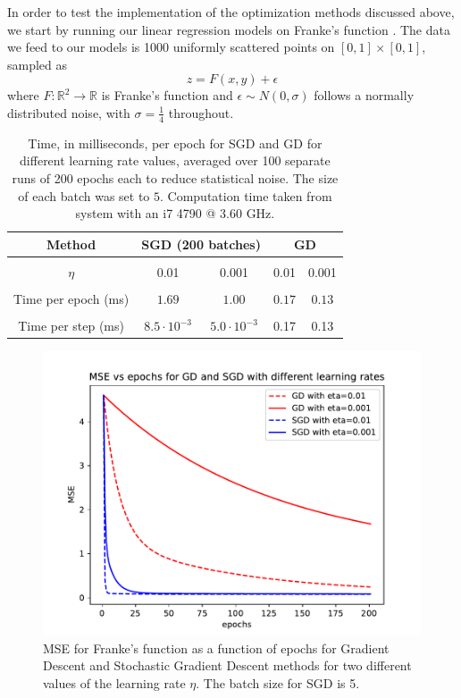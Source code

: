 \documentclass[aps,reprint,superscriptaddress,nofootinbib]{revtex4-2}
\begin{document}
In order to test the implementation of the optimization methods discussed above, we start by running our linear regression models on Franke's function \cite{franke1979critical}. The data we feed to our models is 1000 uniformly scattered points on \([0,1]\times[0,1]\), sampled as
\begin{equation*}
    z = F(x, y) + \epsilon
\end{equation*}
where \(F: \mathbb{R}^2 \xrightarrow{} \mathbb{R}\) is Franke's function and \(\epsilon\sim N\left(0, \sigma \right)\) follows a normally distributed noise, with \(\sigma=\frac{1}{4}\) throughout.

\begin{table}[htp]
    \centering
    \caption{Time, in milliseconds, per epoch for SGD and GD for different learning rate values, averaged over 100 separate runs of 200 epochs each to reduce statistical noise. The size of each batch was set to \(5\). Computation time taken from system with an i7 4790 @ 3.60 GHz.}
    \begin{tabular}[t]{c|c c|c c}
        Method & \multicolumn{2}{c|}{SGD (200 batches)} & \multicolumn{2}{c}{GD} \\
        \hline & & & & \\
        \(\eta\) & 0.01 & 0.001 & 0.01 & 0.001 \\
        \hline & & & & \\
        Time per epoch (ms) & \(1.69\) & \(1.00\) & \(0.17\) & \(0.13\) \\
        & & & & \\
        Time per step (ms) & \(8.5\cdot10^{-3}\) & \(5.0\cdot10^{-3}\) & 0.17 & 0.13
    \end{tabular}
    \label{tab:time_epoch}
\end{table}
\begin{figure}[htp]
    \centering
    \includegraphics[width=\linewidth]{part_a/1_mse_eta_epochs_200_s_bathes_5.pdf}
    \caption{MSE for Franke's function as a function of epochs for Gradient Descent and Stochastic Gradient Descent methods for two different values of the learning rate \(\eta\). The batch size for SGD is 5.}
    \label{fig:mse_epochs_gd_sgd}
\end{figure}
\end{document}
